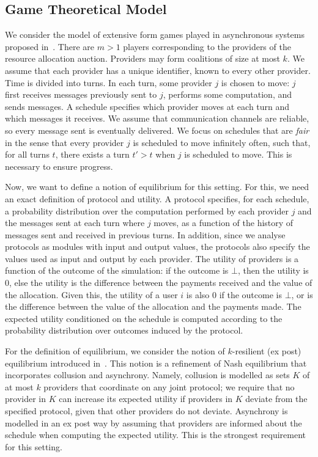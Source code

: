 \subsection{Game Theoretical Model}
We consider the model of extensive form games played in 
asynchronous systems proposed in~\cite{Abraham:13}.
There are $m > 1$ players corresponding to the providers 
of the resource allocation auction.
Providers may form coalitions of size at most $k$. 
We assume that each provider has a unique identifier,
known to every other provider. Time is divided into turns.
In each turn, some provider $j$ is chosen to move:
$j$ first receives messages previously sent to $j$,
performs some computation, and sends messages.
A schedule specifies which provider moves at each turn
and which messages it receives.
We assume that communication channels are reliable,
so every message sent is eventually delivered.
We focus on schedules that are \emph{fair} in the sense
that every provider $j$ is scheduled to move infinitely
often, such that, for all turns $t$, there exists a turn $t'>t$
when $j$ is scheduled to move. This is necessary to ensure progress.

Now, we want to define a notion of equilibrium for this setting.
For this, we need an exact definition of protocol and utility.
A protocol specifies, for each schedule, a probability distribution over
the computation performed by each provider $j$ and the messages sent at each turn where $j$ moves,
as a function of the history of messages sent and received in previous turns.
In addition, since we analyse protocols as modules with input and output values,
the protocols also specify the values used as input and output by each provider.
The utility of providers is a function of the outcome of the simulation:
if the outcome is $\bot$, then the utility is $0$, else the
utility is the difference between the payments received and the value of the allocation.
Given this, the utility of a user $i$ is also $0$ if the outcome is $\bot$,
or is the difference between the value of the allocation and the payments made.
The expected utility conditioned on the schedule is
computed according to the probability distribution over outcomes induced by the protocol.

For the definition of equilibrium, we consider the notion of $k$-resilient 
(ex post) equilibrium introduced in~\cite{Abraham:13}.
This notion is a refinement of Nash equilibrium that incorporates
collusion and asynchrony. Namely, collusion is modelled as sets $K$
of at most $k$ providers that coordinate on any joint protocol;
we require that no provider in $K$ can increase its expected utility
if providers in $K$ deviate from the specified protocol,
given that other providers do not deviate.
Asynchrony is modelled in an ex post way by assuming that providers 
are informed about the schedule when computing the expected utility.
This is the strongest requirement for this setting.

